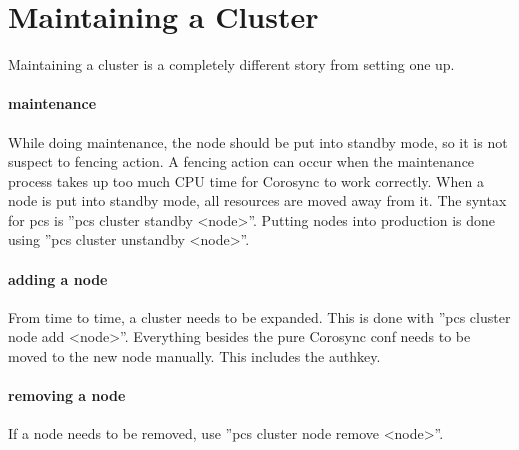 


\section{Maintaining a Cluster}
Maintaining a cluster is a completely different story from setting one up.
\paragraph{maintenance}
While doing maintenance, the node should be put into standby mode, so it is not suspect
to fencing action. A fencing action can occur when the maintenance process
takes up too much CPU time for Corosync to work correctly.
When a node is put into standby mode, all resources are moved away from it.
The syntax for pcs is ''pcs cluster standby \textless node\textgreater''. Putting nodes
into production is done using ''pcs cluster unstandby \textless node\textgreater''.
\paragraph{adding a node}
From time to time, a cluster needs to be expanded.
This is done with ''pcs cluster node add \textless node\textgreater''.
Everything besides the pure Corosync conf needs to be moved to the new
node manually. This includes the authkey.
\paragraph{removing a node}
If a node needs to be removed, use ''pcs cluster node remove \textless node\textgreater''.
